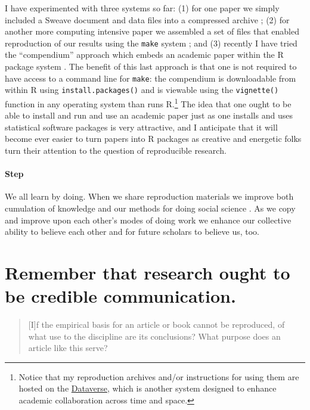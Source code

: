 \documentclass[12pt]{article}
\begin{document}
I have experimented with three systems so far: (1) for one paper we
simply included a Sweave document and data files into a compressed
archive \citep{bowers2005dataverse}; (2) for another more computing
intensive paper we assembled a set of files that enabled reproduction
of our results using the \texttt{make} system
\citep{bowers2008dataverse}; and (3) recently I have tried the
``compendium'' approach
\citep{gentleman2005reproducible,gentleman2007statistical} which
embeds an academic paper within the R package system
\citep{bowers2011dataverse}. The benefit of this last approach is that
one is not required to have access to a command line for \Verb+make+:
the compendium is downloadable from within R using
\Verb+install.packages()+ and is viewable using the \Verb+vignette()+
function in any operating system than runs R.\footnote{Notice that my
  reproduction archives and/or instructions for using them are hosted
  on the
  \href{http://thedata.org/book/learn-about-project}{Dataverse}, which
  is another system designed to enhance academic collaboration across
  time and space.}  The idea that one ought to be able to install and
run and use an academic paper just as one installs and uses
statistical software packages is very attractive, and I anticipate
that it will become ever easier to turn papers into R packages as
creative and energetic folks turn their attention to the question of
reproducible research.

\paragraph{Step \thesection} We all learn by doing. When we share
reproduction materials we improve both cumulation of knowledge and our
methods for doing social science
\citep{freese2007replication,king1995replication}.  As we copy and
improve upon each other's modes of doing work we enhance our collective
ability to believe each other and for future scholars to believe us, too.

\section{Remember that research ought to be credible communication.}
\begin{quote}
  [I]f the empirical basis for an article or book cannot be
  reproduced, of what use to the discipline are its
  conclusions?  What purpose does an article like this serve?
  \cite[445]{king1995replication}
\end{quote}
\end{document}
